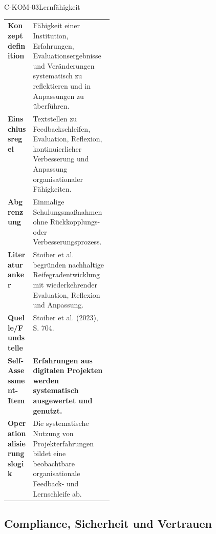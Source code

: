 \documentclass[10pt,a4paper]{article}
\begin{document}
\begin{codecard}{C-KOM-03}{Lernfähigkeit}
\begin{tabularx}{\linewidth}{@{}>{\RaggedRight\arraybackslash\bfseries\color{DeepNavy}}p{0.245\linewidth}>{\RaggedRight\arraybackslash}X@{}}
Konzeptdefinition & Fähigkeit einer Institution, Erfahrungen, Evaluationsergebnisse und Veränderungen systematisch zu reflektieren und in Anpassungen zu überführen. \\
\arrayrulecolor{SoftRule}\hline
Einschlussregel & Textstellen zu Feedbackschleifen, Evaluation, Reflexion, kontinuierlicher Verbesserung und Anpassung organisationaler Fähigkeiten. \\
\arrayrulecolor{SoftRule}\hline
Abgrenzung & Einmalige Schulungsmaßnahmen ohne Rückkopplungs- oder Verbesserungsprozess. \\
\arrayrulecolor{SoftRule}\hline
Literaturanker & Stoiber et al. begründen nachhaltige Reifegradentwicklung mit wiederkehrender Evaluation, Reflexion und Anpassung. \\
\arrayrulecolor{SoftRule}\hline
Quelle/Fundstelle & Stoiber et al. (2023), S. 704. \\
\arrayrulecolor{SoftRule}\hline
Self-Assessment-Item & \textbf{Erfahrungen aus digitalen Projekten werden systematisch ausgewertet und genutzt.} \\
\arrayrulecolor{SoftRule}\hline
Operationalisierungslogik & Die systematische Nutzung von Projekterfahrungen bildet eine beobachtbare organisationale Feedback- und Lernschleife ab. \\
\end{tabularx}
\end{codecard}

\subsection{Compliance, Sicherheit und Vertrauen}
\label{supp:dimension-6}
\end{document}
